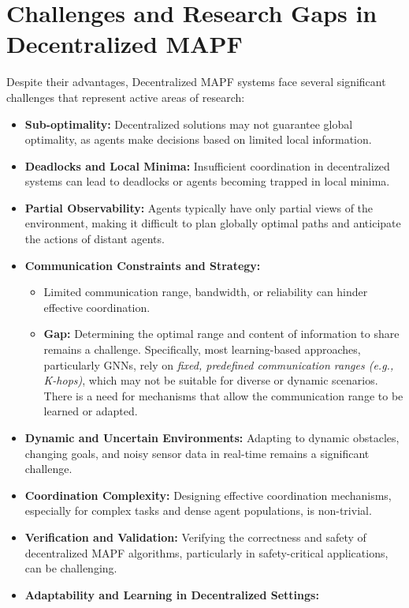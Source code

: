 \section{Challenges and Research Gaps in Decentralized MAPF}
\label{sec:challenges_gaps}
Despite their advantages, Decentralized MAPF systems face several significant challenges that represent active areas of research:
\begin{itemize}
    \item \textbf{Sub-optimality:} Decentralized solutions may not guarantee global optimality, as agents make decisions based on limited local information.
    \item \textbf{Deadlocks and Local Minima:} Insufficient coordination in decentralized systems can lead to deadlocks or agents becoming trapped in local minima.
    \item \textbf{Partial Observability:} Agents typically have only partial views of the environment, making it difficult to plan globally optimal paths and anticipate the actions of distant agents.
    \item \textbf{Communication Constraints and Strategy:}
        \begin{itemize}
            \item Limited communication range, bandwidth, or reliability can hinder effective coordination.
            \item \textbf{Gap:} Determining the optimal range and content of information to share remains a challenge. Specifically, most learning-based approaches, particularly GNNs, rely on \textit{fixed, predefined communication ranges (e.g., K-hops)}, which may not be suitable for diverse or dynamic scenarios. There is a need for mechanisms that allow the communication range to be learned or adapted.
        \end{itemize}
    \item \textbf{Dynamic and Uncertain Environments:} Adapting to dynamic obstacles, changing goals, and noisy sensor data in real-time remains a significant challenge.
    \item \textbf{Coordination Complexity:} Designing effective coordination mechanisms, especially for complex tasks and dense agent populations, is non-trivial.
    \item \textbf{Verification and Validation:} Verifying the correctness and safety of decentralized MAPF algorithms, particularly in safety-critical applications, can be challenging.
    \item \textbf{Adaptability and Learning in Decentralized Settings:}

\end{itemize}
